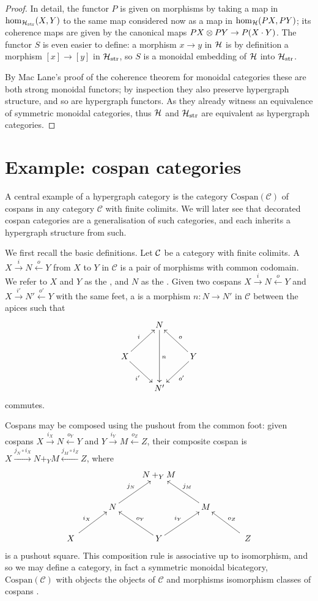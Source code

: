 \begin{proof}
  In detail, the functor $P$ is given on morphisms by taking a map in
  $\mathrm{hom}_{\mathcal H_{\mathrm{str}}}(X,Y)$ to the same map considered now as a
  map in $\mathrm{hom}_{\mathcal H}(PX,PY)$; its coherence maps are given by the
  canonical maps $PX \otimes PY \to P(X\cdot Y)$. The functor $S$ is even easier to
  define: a morphism $x \to y$ in $\mathcal H$ is by definition a morphism $[x] \to
  [y]$ in $\mathcal H_{\mathrm{str}}$, so $S$ is a monoidal embedding of $\mathcal H$ into
  $\mathcal H_{\mathrm{str}}$. 
  
  By Mac Lane's proof of the coherence theorem for monoidal categories these are
  both strong monoidal functors; by inspection they also preserve hypergraph
  structure, and so are hypergraph functors.  As they already witness an
  equivalence of symmetric monoidal categories, thus $\mathcal H$ and $\mathcal
  H_{\mathrm{str}}$ are equivalent as hypergraph categories.
\end{proof}

\section{Example: cospan categories}

A central example of a hypergraph category is the category
$\mathrm{Cospan(\mathcal C)}$ of cospans in any category $\mathcal C$ with
finite colimits. We will later see that decorated cospan categories are a
generalisation of such categories, and each inherits a hypergraph structure
from such. 

We first recall the basic definitions. Let $\mathcal C$ be a category
with finite colimits. A  $X \stackrel{i}{\longrightarrow} N
\stackrel{o}{\longleftarrow} Y$  from $X$ to $Y$ in $\mathcal C$ is a pair of
morphisms with common codomain. We refer to $X$ and $Y$ as the ,
and $N$ as the .  Given two cospans $X
\stackrel{i}{\longrightarrow} N \stackrel{o}{\longleftarrow} Y$ and $X
\stackrel{i'}{\longrightarrow} N' \stackrel{o'}{\longleftarrow} Y$ with the same
feet, a  is a morphism $n\colon  N \to N'$ in $\mathcal
C$ between the apices such that
\[
  \xymatrix{
    & N \ar[dd]^n  \\
    X \ar[ur]^{i} \ar[dr]_{i'} && Y \ar[ul]_{o} \ar[dl]^{o'}\\
    & N'
  }
\]
commutes.

Cospans may be composed using the pushout from the common
foot: given cospans $X \stackrel{i_X}{\longrightarrow} N
\stackrel{o_Y}{\longleftarrow} Y$ and $Y \stackrel{i_Y}{\longrightarrow} M
\stackrel{o_Z}{\longleftarrow} Z$, their composite cospan is $X \stackrel{j_N
  \circ i_X}{\longrightarrow} N+_YM \stackrel{j_M\circ i_Z}{\longleftarrow} Z$,
  where 
\[
  \xymatrix{
    && N+_YM \\
    & N \ar[ur]^{j_N} && M \ar[ul]_{j_M} \\
    \quad X \quad \ar[ur]^{i_X} && Y \ar[ul]_{o_Y} \ar[ur]^{i_Y} && \quad Z \quad \ar[ul]_{o_Z}
  }
\]
is a pushout square. This composition rule is associative up to isomorphism, and
so we may define a category, in fact a symmetric monoidal bicategory,
$\mathrm{Cospan}(\mathcal C)$ with objects the objects of $\mathcal C$ and
morphisms isomorphism classes of cospans \cite{Ben}.

